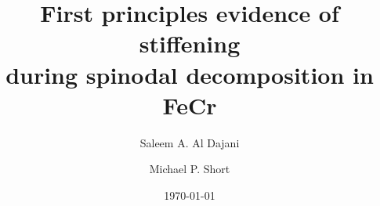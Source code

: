 \documentclass[final,3p,times]{elsarticle}
\providecommand{\DIFaddbegin}{} %
\providecommand{\DIFaddend}{} %
\providecommand{\DIFdelbegin}{} %
\providecommand{\DIFdelend}{} %
\begin{document}
\begin{frontmatter}

\DIFdelbegin %

\DIFdelend \title
{
\textbf
{
First principles evidence of stiffening \\ during spinodal decomposition in FeCr
}
}

\date
{\today}
\rhead{\today}

\DIFdelbegin %

\DIFdelend \author[1]{Saleem A. Al Dajani}
\author[1]{Michael P. Short}

\address{
Department of Nuclear Science and Engineering \\
Massachusetts Institute of Technology\\
77 Massachusetts Avenue \\
Cambridge, MA 02139}

\address[1]
{
Corresponding Author: \href{mailto:sdajani@mit.edu}{\texttt{sdajani@mit.edu}}
}
\DIFaddbegin 

\DIFaddend \begin{abstract}


\end{abstract}
\end{frontmatter}
\end{document}
